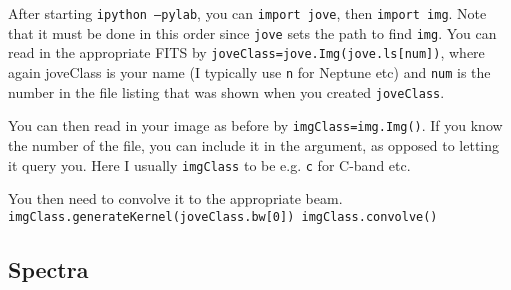 \documentclass[11pt]{article}
\begin{document}
After starting \texttt{ipython --pylab}, you can \texttt{import jove}, then \texttt{import img}.  Note that it must be done in this order since \texttt{jove} sets the path to find \texttt{img}.   You can read in the appropriate FITS by \texttt{joveClass=jove.Img(jove.ls[num])}, where again joveClass is your name (I typically use \texttt{n} for Neptune etc) and \texttt{num} is the number in the file listing that was shown when you created \texttt{joveClass}.

You can then read in your image as before by \texttt{imgClass=img.Img()}.  If you know the number of the file, you can include it in the argument, as opposed to letting it query you.  Here I usually \texttt{imgClass} to be e.g. \texttt{c} for C-band etc.

You then need to convolve it to the appropriate beam.
\texttt{
imgClass.generateKernel(joveClass.bw[0])
imgClass.convolve()
}

\subsection{Spectra}




\end{document}
